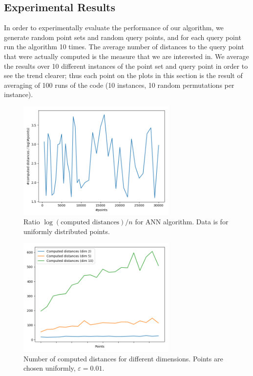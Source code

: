 \documentclass[a4paper,USenglish]{socg-lipics-v2018}
\newcommand{\eps}{\varepsilon}
\begin{document}



\subsection{Experimental Results}

In order to experimentally evaluate the performance of our algorithm,
we generate random point sets and random query points, and for each query point
run the algorithm 10 times. The average number of distances to the query point
that were actually computed is the measure that we are interested in.
We average the results over 10 different instances of the point
set and query point in order to see the trend clearer; thus
each point on the plots in this section is the result of averaging of 100 runs
of the code (10 instances, 10 random permutations per instance).

\begin{figure}[ht]
    \label{fig:ann_const_ratio}
    \includegraphics[width=0.7\textwidth]{pics/log_dependency_constant_ratio.png}
    \caption{Ratio $\log(\mbox{computed distances}) / n$ for ANN algorithm. Data is for uniformly distributed
    points.}
\end{figure}

\begin{figure}[ht]
    \label{fig:ann_dimension_dependency}
    \includegraphics[width=0.7\textwidth]{pics/ann_computed_distances_dimension_dep.png}
    \caption{Number of computed distances for different dimensions. Points are chosen uniformly, $\eps = 0.01$.}
\end{figure}
\end{document}
